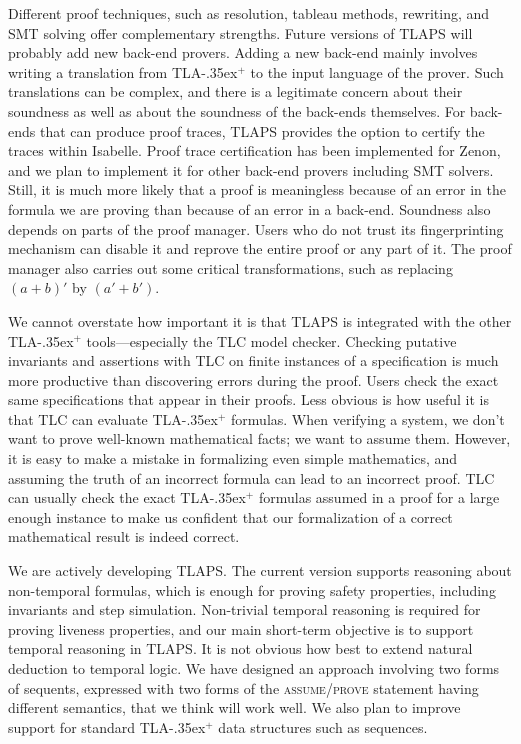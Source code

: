 \documentclass[a4paper]{llncs}
\newcommand{\tlaplus}{\mbox{TLA\kern -.35ex$^+$}\xspace}
\begin{document}
Different proof techniques, such as resolution, tableau methods,
rewriting, and SMT solving offer complementary strengths.
Future versions of TLAPS will probably add new back-end provers.
Adding a new back-end mainly involves writing a translation from
\tlaplus to the input language of the prover.  Such
translations can be complex, and there is a legitimate concern about
their soundness as well as about the soundness of the back-ends
themselves.  For back-ends that can produce proof traces, TLAPS
provides the option to certify the traces within Isabelle.
Proof trace certification has been implemented for Zenon,
and we plan to implement it for other back-end provers including SMT
solvers.  Still, it is much more likely that a proof is meaningless
because of an error in the formula we are proving than because of
an error in a back-end.  Soundness also depends on 
parts of the proof manager.
Users who do not trust its fingerprinting mechanism can
disable it and reprove the entire proof or any part of it.
The proof manager also carries out some critical transformations, such
as replacing $(a+b)'$ by $(a'+b')$.

We cannot overstate how important it is that TLAPS is integrated with the other
\tlaplus tools---especially the TLC model checker. Checking putative invariants
and assertions with TLC on finite instances of a specification is much more
productive than discovering errors during the proof. Users check the exact same
specifications that appear in their proofs. Less obvious is how useful it is
that TLC can evaluate \tlaplus formulas. When verifying a system, we don't want
to prove well-known mathematical facts; we want to assume them. However, it is
easy to make a mistake in formalizing even simple mathematics, and assuming the
truth of an incorrect formula can lead to an incorrect proof. TLC can usually
check the exact \tlaplus formulas assumed in a proof for a large enough instance
to make us confident that our formalization of a correct mathematical result is
indeed correct.

We are actively developing TLAPS. 
The current version supports reasoning about non-temporal formulas, which is
enough for proving safety properties, including invariants and step simulation.
Non-trivial temporal reasoning is required for proving liveness properties, and
our main short-term objective is to support temporal reasoning in TLAPS. It is
not obvious how best to extend natural deduction to temporal logic. We have
designed an approach involving two forms of sequents, expressed with two forms
of the \textsc{assume}/\textsc{prove} statement having
different semantics, that we think will work well.
We also plan to improve support for standard \tlaplus data structures such as
sequences.
\end{document}
